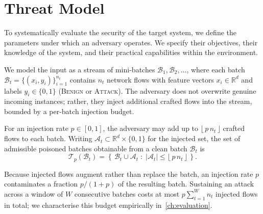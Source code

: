 \section{Threat Model}
To systematically evaluate the security of the target system, we define the parameters under which an adversary operates. We specify their objectives, their knowledge of the system, and their practical capabilities within the environment.

We model the input as a stream of mini-batches $\mathcal{B}_1, \mathcal{B}_2, \dots$, where each batch $\mathcal{B}_t = \{(x_i, y_i)\}_{i=1}^{n_t}$ contains $n_t$ network flows with feature vectors $x_i \in \mathbb{R}^{d}$ and labels $y_i \in \{0, 1\}$ (\textsc{Benign} or \textsc{Attack}). The adversary does not overwrite genuine incoming instances; rather, they inject additional crafted flows into the stream, bounded by a per-batch injection budget.

\begin{definition}
\label{def:injection_budget}
For an injection rate $p \in [0, 1]$, the adversary may add up to $\lfloor\,p\, n_t \,\rfloor$ crafted flows to each batch. Writing $\mathcal{A}_t \subset \mathbb{R}^{d} \times \{0, 1\}$ for the injected set, the set of admissible poisoned batches obtainable from a clean batch $\mathcal{B}_t$ is
\begin{equation}
  \mathcal{T}_p(\mathcal{B}_t) = \left\{\, \mathcal{B}_t \cup \mathcal{A}_t \;:\; \lvert \mathcal{A}_t \rvert \le \lfloor\,p\, n_t\,\rfloor \,\right\}.
  \label{eq:injection_budget}
\end{equation}
\end{definition}

Because injected flows augment rather than replace the batch, an injection rate $p$ contaminates a fraction $p / (1 + p)$ of the resulting batch. Sustaining an attack across a window of $W$ consecutive batches costs at most $p \sum_{t=1}^{W} n_t$ injected flows in total; we characterise this budget empirically in~\cref{ch:evaluation}.

